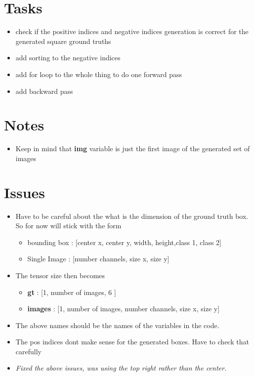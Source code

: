 \documentclass[10pt,a4paper]{article}
\begin{document}
\section*{Tasks}

\begin{itemize}
\item check if the positive indices and negative indices generation is correct for the generated square ground truths
\item add sorting to the negative indices  

\item add for loop to the whole thing to do one forward pass 
\item add backward pass 
 

\end{itemize}


\section*{Notes}
\begin{itemize}
\item Keep in mind that \textbf{img} variable is just the first image of the generated set of images

\end{itemize}




\section*{Issues} 
\begin{itemize}
\item Have to be careful about the what is the dimension of the ground truth box. So for now will stick with the form  


\begin{itemize}
\item bounding box : [center x, center y, width, height,class 1, class 2]
\item Single Image  : [number channels, size x, size y]  
\end{itemize}
    
\item The tensor size then becomes    
    

\begin{itemize}
\item \textbf{gt} : [1, number of images,  6 ]
\item \textbf{images} : [1, number of images, number channels, size x, size y]  
\end{itemize}    


\item The above names should be the names of the variables in the code.
 
\item The pos indices dont make sense for the generated boxes. Have to check that carefully  

\item\textit{Fixed the above issues, was using the top right rather than the center.}   
    
\end{itemize}
\end{document}
